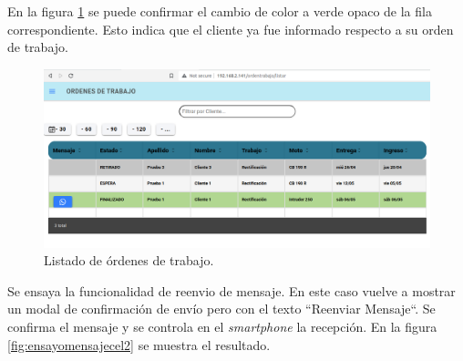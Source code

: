 En la figura \ref{fig:ensayomensajefinalizado} se puede confirmar el cambio de color a verde opaco de la fila correspondiente. Esto indica que el cliente ya fue informado respecto a su orden de trabajo.

\begin{figure}[H]
	\centering
	\includegraphics[width=\textwidth]{./Figures/ensayo-1/17.finalizado.png}
	\caption{Listado de órdenes de trabajo.}
	\label{fig:ensayomensajefinalizado}
\end{figure}

Se ensaya la funcionalidad de reenvio de mensaje. En este caso vuelve a mostrar un modal de confirmación de envío pero con el texto ``Reenviar Mensaje``. Se confirma el mensaje y se controla en el \textit{smartphone} la recepción. En la figura \ref{fig:ensayomensajecel2} se muestra el resultado.

